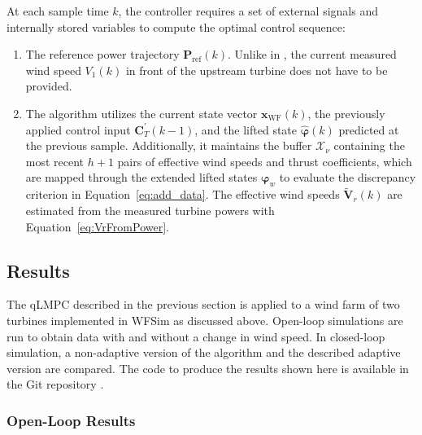 %
At each sample time $k$, the controller requires a set of external signals and internally stored variables to compute the optimal control sequence:
\begin{enumerate}
    \item The reference power trajectory $\bm{P}_{\text{ref}}(k)$. Unlike in \cite{dittmer2022data}, the current measured wind speed $V_{1}(k)$ in front of the upstream turbine does not have to be provided.
    
    \item The algorithm utilizes the current state vector $\bm{x}_{\text{WF}}(k)$, the previously applied control input $\bm{C}_T^\prime(k-1)$, and the lifted state $\hat{\bm{\varphi}}(k)$ predicted at the previous sample. Additionally, it maintains the buffer $\mathcal{X}_{\nu}$ containing the most recent $h+1$ pairs of effective wind speeds and thrust coefficients, which are mapped through the extended lifted states $\bm{\varphi}_w$ to evaluate the discrepancy criterion in Equation~\eqref{eq:add_data}. The effective wind speeds $\tilde{\bm{V}}_r(k)$ are estimated from the measured turbine powers with Equation~\eqref{eq:VrFromPower}.
\end{enumerate}

\subsection{Results} \label{section:AICWindFarmControl}
The qLMPC described in the previous section is applied to a wind farm of two turbines implemented in WFSim as discussed above. Open-loop simulations are run to obtain data with and without a change in wind speed. In closed-loop simulation, a non-adaptive version of the algorithm and the described adaptive version are compared. The code to produce the results shown here is available in the Git repository \cite{GitRepoCodeWF}. %

\subsubsection{Open-Loop Results}

